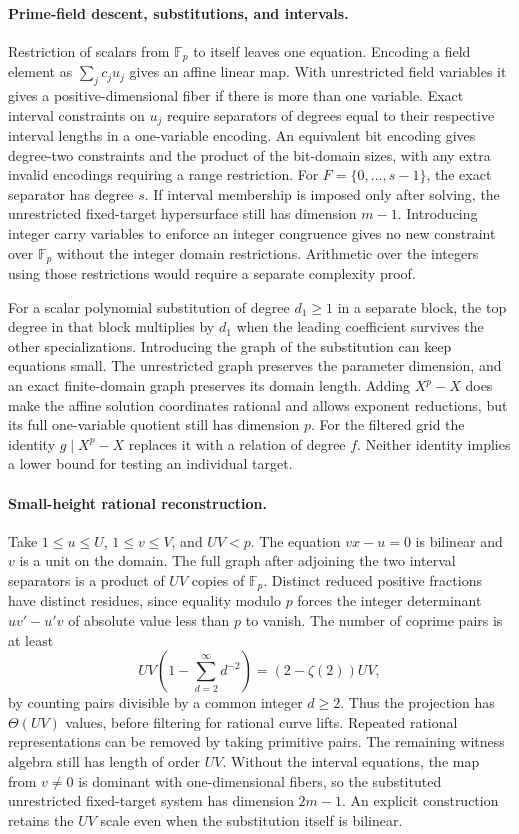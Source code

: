 \documentclass[11pt]{article}
\newcommand{\Fp}{\mathbb F_p}
\begin{document}
\paragraph{Prime-field descent, substitutions, and intervals.}
Restriction of scalars from \(\Fp\) to itself leaves one equation. Encoding a field element as \(\sum_j c_j u_j\) gives an affine linear map. With unrestricted field variables it gives a positive-dimensional fiber if there is more than one variable. Exact interval constraints on \(u_j\) require separators of degrees equal to their respective interval lengths in a one-variable encoding. An equivalent bit encoding gives degree-two constraints and the product of the bit-domain sizes, with any extra invalid encodings requiring a range restriction. For \(F=\{0,\ldots,s-1\}\), the exact separator has degree \(s\). If interval membership is imposed only after solving, the unrestricted fixed-target hypersurface still has dimension \(m-1\). Introducing integer carry variables to enforce an integer congruence gives no new constraint over \(\Fp\) without the integer domain restrictions. Arithmetic over the integers using those restrictions would require a separate complexity proof.

For a scalar polynomial substitution of degree \(d_1\ge1\) in a separate block, the top degree in that block multiplies by \(d_1\) when the leading coefficient survives the other specializations. Introducing the graph of the substitution can keep equations small. The unrestricted graph preserves the parameter dimension, and an exact finite-domain graph preserves its domain length. Adding \(X^p-X\) does make the affine solution coordinates rational and allows exponent reductions, but its full one-variable quotient still has dimension \(p\). For the filtered grid the identity \(g\mid X^p-X\) replaces it with a relation of degree \(f\). Neither identity implies a lower bound for testing an individual target.

\paragraph{Small-height rational reconstruction.}
Take \(1\le u\le U\), \(1\le v\le V\), and \(UV<p\). The equation \(vx-u=0\) is bilinear and \(v\) is a unit on the domain. The full graph after adjoining the two interval separators is a product of \(UV\) copies of \(\Fp\). Distinct reduced positive fractions have distinct residues, since equality modulo \(p\) forces the integer determinant \(uv'-u'v\) of absolute value less than \(p\) to vanish. The number of coprime pairs is at least
\[
UV\left(1-\sum_{d=2}^{\infty}d^{-2}\right)=(2-\zeta(2))UV,
\]
by counting pairs divisible by a common integer \(d\ge2\). Thus the projection has \(\Theta(UV)\) values, before filtering for rational curve lifts. Repeated rational representations can be removed by taking primitive pairs. The remaining witness algebra still has length of order \(UV\). Without the interval equations, the map from \(v\ne0\) is dominant with one-dimensional fibers, so the substituted unrestricted fixed-target system has dimension \(2m-1\). An explicit construction retains the \(UV\) scale even when the substitution itself is bilinear.
\end{document}
